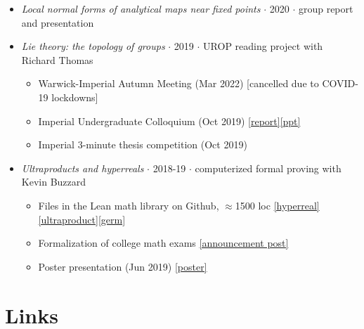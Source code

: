 \documentclass{article}
\begin{document}
\begin{itemize}
    \item \emph{Local normal forms of analytical maps near fixed points} $\cdot$ 2020 $\cdot$ group report and presentation
    
    \item \emph{Lie theory: the topology of groups} $\cdot$ 2019 $\cdot$ UROP reading project with Richard Thomas

    \begin{itemize}
        \item Warwick-Imperial Autumn Meeting (Mar 2022) [cancelled due to COVID-19 lockdowns] 
        \item Imperial Undergraduate Colloquium (Oct 2019) \href{https://drive.google.com/file/d/1F5ZrQmRhkpp7dWFbjHreB-4pX4uR80VX/view?usp=drive_link}{[report]}\href{https://drive.google.com/file/d/1BYsFoRl5F6DBN7ARMdc-I1TrIKJgMqgY/view?usp=drive_link}{[ppt]}
        \item Imperial 3-minute thesis competition (Oct 2019)
    \end{itemize}

    \item \emph{Ultraproducts and hyperreals} $\cdot$ 2018-19 $\cdot$ computerized formal proving with Kevin Buzzard

    \begin{itemize}
        \item Files in the Lean math library on Github, $\approx$1500 loc \href{https://github.com/leanprover-community/mathlib/blob/master/src/data/real/hyperreal.lean}{[hyperreal]}\href{https://github.com/leanprover-community/mathlib/blob/master/src/order/filter/filter_product.lean}{[ultraproduct]}\href{https://github.com/leanprover-community/mathlib/blob/master/src/order/filter/germ.lean}{[germ]}
        \item Formalization of college math exams \href{https://xenaproject.wordpress.com/2019/05/06/m1f-imperial-undergraduates-and-lean/}{[announcement post]}
        \item Poster presentation (Jun 2019) \href{https://drive.google.com/file/d/1FAx-c7pPaaKvjInDIQGr_gnhEnofc_vJ/view?usp=drive_link}{[poster]}
    \end{itemize}

\end{itemize}


\section*{Links}
\end{document}
